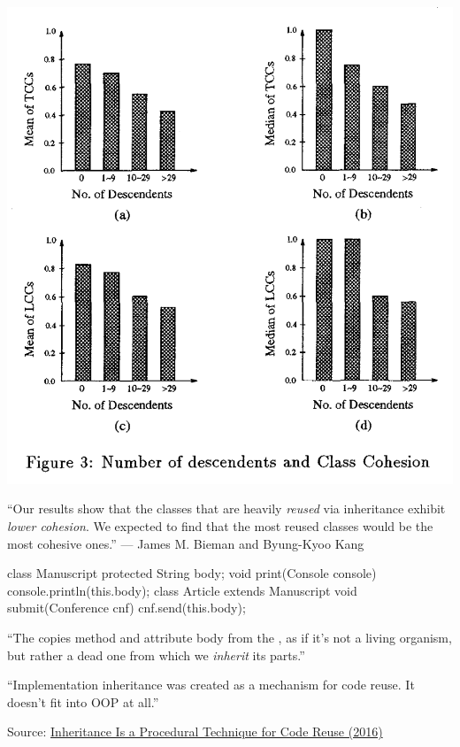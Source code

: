 \documentclass{article}
\begin{document}
\begin{multicols}{2}
\includegraphics[width=.9\columnwidth]{graphs.png}
\par\columnbreak\par
``Our results show that the classes that are heavily \emph{reused} via inheritance exhibit \emph{lower cohesion}. We expected to find that the most reused classes would be the most cohesive ones.'' --- James M. Bieman and Byung-Kyoo Kang
\end{multicols}
\plush{}

\begin{multicols}{2}
{\small\begin{ffcode}
class Manuscript {
  protected String body;
  void print(Console console) {
    console.println(this.body);
  }
}
class Article
  extends Manuscript {
  void submit(Conference cnf) {
    cnf.send(this.body);
  }
}
\end{ffcode}
}
\par\columnbreak\par
``The  copies method  and attribute body from the , as if it’s not a living organism, but rather a dead one from which we \emph{inherit} its parts.''\par
``Implementation inheritance was created as a mechanism for code reuse. It doesn't fit into OOP at all.''\par
{\scriptsize Source: \href{https://www.yegor256.com/2016/09/13/inheritance-is-procedural.html}{Inheritance Is a Procedural Technique for Code Reuse (2016)}\par}
\end{multicols}
\plush{}
\end{document}
